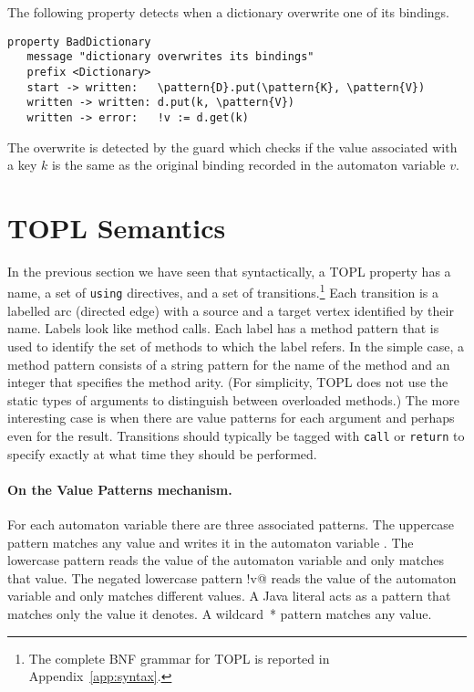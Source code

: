 \documentclass[10pt, preprint]{sigplanconf} %
\newcommand{\delimitVerbatim}{\par\nobreak\smallskip\noindent}
\newcommand{\pattern}[1]{\ensuremath{\mathtt{\underline{#1}}}}
\begin{document}
The following property detects when a dictionary overwrite one of its bindings.
\delimitVerbatim
\begin{Verbatim}[commandchars=\\\{\}]
 property BadDictionary
   message "dictionary overwrites its bindings"
   prefix <Dictionary>
   start -> written:   \pattern{D}.put(\pattern{K}, \pattern{V})
   written -> written: d.put(k, \pattern{V})
   written -> error:   !v := d.get(k)
\end{Verbatim}
\delimitVerbatim
The overwrite is detected by the guard which checks if the value associated with a key $k$ is the same as the original binding recorded in the automaton variable $v$.

\section{TOPL  Semantics}\label{sec:semantics} %
In the previous section we have seen that syntactically, a TOPL property has a name, a set of \texttt{using} directives, and a set of transitions.\footnote{The complete BNF grammar for TOPL is reported in Appendix~\ref{app:syntax}.}
Each transition is a labelled arc (directed edge) with a source and a target vertex identified by their name.
Labels look like method calls.
Each label has a method pattern that is used to identify the set of methods to which the label refers.
In the simple case, a method pattern consists of a string pattern for the name of the method and an integer that specifies the method arity.
(For simplicity, TOPL does not use the static types of arguments to distinguish between overloaded methods.)
The more interesting case is when there are value patterns for each argument and perhaps even for the result.
Transitions should typically be tagged with \texttt{call} or \texttt{return} to specify exactly at what time they should be performed.

\paragraph{On the Value Patterns mechanism.}
For each automaton variable \Verb@v@ there are three associated patterns.
The uppercase pattern \Verb@V@ matches any value and writes it in the automaton variable \Verb@v@.
The lowercase pattern \Verb@v@ reads the value of the automaton variable \Verb@v@ and only matches that value.
The negated lowercase pattern \Verb@!v@ reads the value of the automaton variable \Verb@v@ and only matches different values.
A Java literal acts as a pattern that matches only the value it denotes.
A wildcard~* pattern matches any value.
\end{document}
